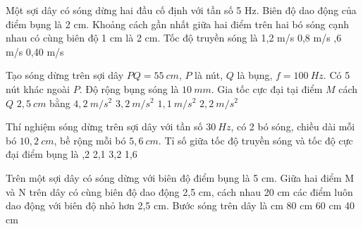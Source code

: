 \begin{ex}%
Một sợi dây có sóng dừng hai đầu cố định với tần số 5 Hz. Biên độ dao động của điểm bụng là 2 cm. Khoảng cách gần nhất giữa hai điểm trên hai bó sóng cạnh nhau có cùng biên độ 1 cm là 2 cm. Tốc độ truyền sóng là
\choice
{1,2 m/s}
{0,8 m/s}
{,6 m/s}
{0,40 m/s}
\end{ex} 
\begin{ex}
Tạo sóng dừng trên sợi dây $PQ = 55\ cm$, $P$ là nút, $Q$ là bụng, $f = 100\ Hz$. Có 5 nút khác ngoài $P$. Độ rộng bụng sóng là $10\ mm$. Gia tốc cực đại tại điểm $M$ cách $Q$ $2,5\ cm$ bằng
\choice
{$4,2\ m/s^2$}
{$3,2\ m/s^2$}
{$1,1\ m/s^2$}
{\True $2,2\ m/s^2$}
\end{ex}
\begin{ex}
Thí nghiệm sóng dừng trên sợi dây với tần số $30\ Hz$, có 2 bó sóng, chiều dài mỗi bó $10,2\ cm$, bề rộng mỗi bó $5,6\ cm$. Tỉ số giữa tốc độ truyền sóng và tốc độ cực đại điểm bụng là
\choice
{,2}
{2,1}
{3,2}
{1,6}
\end{ex}
\begin{ex}%
Trên một sợi dây có sóng dừng với biên độ điểm bụng là 5 cm. Giữa hai điểm M và N trên dây có cùng biên độ dao động 2,5 cm, cách nhau 20 cm các điểm luôn dao động với biên độ nhỏ hơn 2,5 cm. Bước sóng trên dây là
\choice
{ cm}
{80 cm}
{60 cm}
{40 cm}
\end{ex} 
